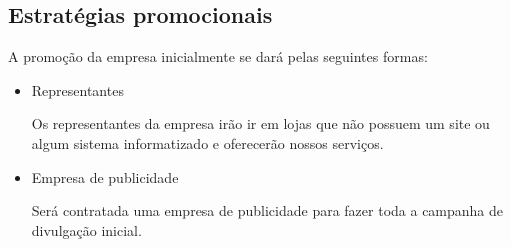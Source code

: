 \subsection{Estratégias promocionais}

	A promoção da empresa inicialmente se dará pelas seguintes formas:

	\begin{itemize}
		\item{Representantes}

			Os representantes da empresa irão ir em lojas que não possuem um site ou algum sistema informatizado e oferecerão nossos serviços.

		\item{Empresa de publicidade}

			Será contratada uma empresa de publicidade para fazer toda a campanha de divulgação inicial.
	\end{itemize}